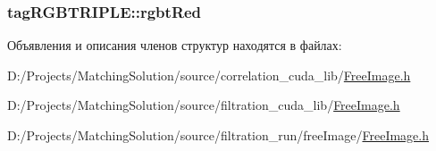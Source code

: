 \hypertarget{structtag_r_g_b_t_r_i_p_l_e_e61b0771fd3e1e267a3495dcfba5e21c}{
\subsubsection[{rgbtRed}]{ {\bf tagRGBTRIPLE::rgbtRed}}}
\label{structtag_r_g_b_t_r_i_p_l_e_e61b0771fd3e1e267a3495dcfba5e21c}




Объявления и описания членов структур находятся в файлах:\begin{CompactItemize}
\item 
D:/Projects/MatchingSolution/source/correlation\_\-cuda\_\-lib/\hyperlink{correlation__cuda__lib_2_free_image_8h}{FreeImage.h}\item 
D:/Projects/MatchingSolution/source/filtration\_\-cuda\_\-lib/\hyperlink{filtration__cuda__lib_2_free_image_8h}{FreeImage.h}\item 
D:/Projects/MatchingSolution/source/filtration\_\-run/freeImage/\hyperlink{filtration__run_2free_image_2_free_image_8h}{FreeImage.h}\end{CompactItemize}

